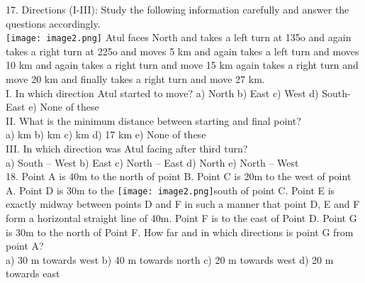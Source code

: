 \documentclass[
]{article}
\begin{document}
17. Directions (I-III): Study the following information carefully and answer the questions
accordingly.\\
\texttt{[image: image2.png]}
Atul faces North and takes a left turn at 135o and again takes a right turn at 225o and moves
5 km and again takes a left turn and moves 10 km and again takes a right turn and move 15
km again takes a right turn and move 20 km and finally takes a right turn and move 27 km.\\

I. In which direction Atul started to move?
a) North \hspace{2mm}b) East \hspace{2mm}c) West \hspace{2mm}d) South-East \hspace{2mm}e) None of these\\

II. What is the minimum distance between starting and final point?\\
a)  km \hspace{2mm}b)  km \hspace{2mm}c)  km \hspace{2mm}d) 17 km \hspace{2mm}e) None of these\\

III. In which direction was Atul facing after third turn?\\
a) South – West \hspace{2mm}b) East \hspace{2mm}c) North – East \hspace{2mm}d) North \hspace{2mm}e) North – West\\

18. Point A is 40m to the north of point B. Point C is 20m to the west of point A. Point D is 30m
to the \texttt{[image: image2.png]}south of point C. Point E is exactly midway between points D and F in such a manner
that point D, E and F form a horizontal straight line of 40m. Point F is to the east of Point D.
Point G is 30m to the north of Point F. How far and in which directions is point G from point
A?\\
a) 30 m towards west \hspace{2mm}b) 40 m towards north \hspace{2mm}c) 20 m towards west \hspace{2mm}d) 20 m towards east\\
\end{document}
